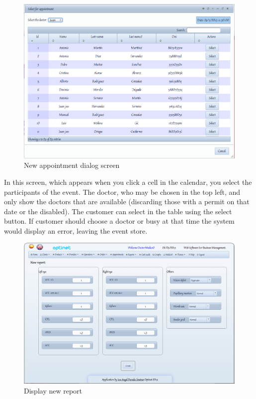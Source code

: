 \documentclass[a4paper,11pt]{book}
\begin{document}
\newpage
\begin{figure}[!htb]
  \centering
    \includegraphics[scale=0.35]{icapcitas1.png}
  \caption{New appointment dialog screen}
  \label{a}
\end{figure}

In this screen, which appears when you click a cell in the calendar, you select the participants of the event. The doctor, who may be chosen in the top left, and only show the doctors that are available (discarding those with a permit on that date or the disabled). The customer can select in the table using the select button. If customer should choose a doctor or busy at that time the system would display an error, leaving the event store.

\newpage
\begin{figure}[!htb]
  \centering
    \includegraphics[scale=0.35]{icapregistrarinforme.png}
  \caption{Display new report}
  \label{a}
\end{figure}
\end{document}
